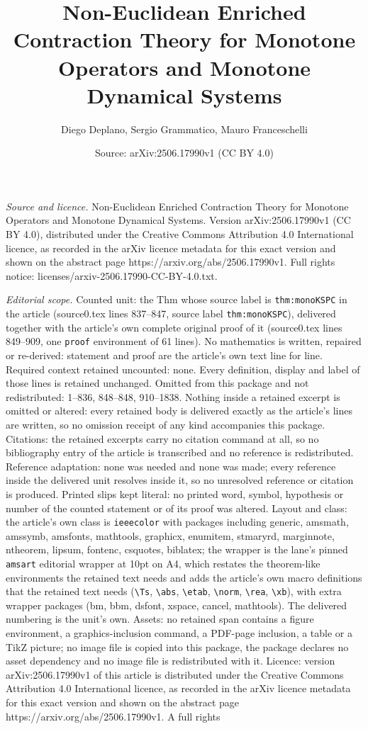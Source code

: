 \documentclass[10pt,a4paper]{amsart}
\title[Non-Euclidean Enriched Contraction Theory for Monotone Opera]{Non-Euclidean Enriched Contraction Theory for Monotone Operators and Monotone Dynamical Systems}
\author{Diego Deplano, Sergio Grammatico, Mauro Franceschelli}
\date{Source: arXiv:2506.17990v1 (CC BY 4.0)}
\begin{document}
\maketitle

\noindent\emph{Source and licence.} Non-Euclidean Enriched Contraction Theory for Monotone Operators and Monotone Dynamical Systems. Version arXiv:2506.17990v1 (CC BY 4.0), distributed under the Creative Commons Attribution 4.0 International licence, as recorded in the arXiv licence metadata for this exact version and shown on the abstract page https://arxiv.org/abs/2506.17990v1. Full rights notice: licenses/arxiv-2506.17990-CC-BY-4.0.txt.\par\smallskip

\noindent\textit{Editorial scope.} Counted unit: the Thm whose source label is \texttt{thm:monoKSPC} in the article (source0.tex lines 837--847, source label \texttt{thm:monoKSPC}), delivered together with the article's own complete original proof of it (source0.tex lines 849--909, one \texttt{proof} environment of 61 lines). No mathematics is written, repaired or re-derived: statement and proof are the article's own text line for line. Required context retained uncounted: none. Every definition, display and label of those lines is retained unchanged. Omitted from this package and not redistributed: 1--836, 848--848, 910--1838. Nothing inside a retained excerpt is omitted or altered: every retained body is delivered exactly as the article's lines are written, so no omission receipt of any kind accompanies this package. Citations: the retained excerpts carry no citation command at all, so no bibliography entry of the article is transcribed and no reference is redistributed. Reference adaptation: none was needed and none was made; every reference inside the delivered unit resolves inside it, so no unresolved reference or citation is produced. Printed slips kept literal: no printed word, symbol, hypothesis or number of the counted statement or of its proof was altered. Layout and class: the article's own class is \texttt{ieeecolor} with packages including generic, amsmath, amssymb, amsfonts, mathtools, graphicx, enumitem, stmaryrd, marginnote, ntheorem, lipsum, fontenc, csquotes, biblatex; the wrapper is the lane's pinned \texttt{amsart} editorial wrapper at 10pt on A4, which restates the theorem-like environments the retained text needs and adds the article's own macro definitions that the retained text needs (\texttt{\textbackslash Ts}, \texttt{\textbackslash abs}, \texttt{\textbackslash etab}, \texttt{\textbackslash norm}, \texttt{\textbackslash rea}, \texttt{\textbackslash xb}), with extra wrapper packages (bm, bbm, dsfont, xspace, cancel, mathtools). The delivered numbering is the unit's own. Assets: no retained span contains a figure environment, a graphics-inclusion command, a PDF-page inclusion, a table or a TikZ picture; no image file is copied into this package, the package declares no asset dependency and no image file is redistributed with it. Licence: version arXiv:2506.17990v1 of this article is distributed under the Creative Commons Attribution 4.0 International licence, as recorded in the arXiv licence metadata for this exact version and shown on the abstract page https://arxiv.org/abs/2506.17990v1. A full rights 
\end{document}

